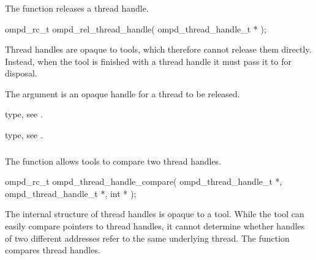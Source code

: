\subsubsection{}
\label{subsubsubsec:ompd_rel_thread_handle}
\summary
The  function releases a thread handle.

\format
\begin{cspecific}
\begin{ompSyntax}
ompd_rc_t ompd_rel_thread_handle(
  ompd_thread_handle_t *
);
\end{ompSyntax}
\end{cspecific}

\descr
Thread handles are opaque to tools, which therefore cannot release them 
directly. Instead, when the tool is finished with a thread handle it must 
pass it to  for disposal.

\argdesc
The  argument is an opaque handle for a thread to be released.

\begin{crossrefs}
\item {} type, 
see .

\item {} type, see .
\end{crossrefs}



\subsubsection{}
\label{subsubsubsec:ompd_thread_handle_compare}
\summary
The  function allows tools to compare
two thread handles.

\format
\begin{cspecific}
\begin{ompSyntax}
ompd_rc_t ompd_thread_handle_compare(
  ompd_thread_handle_t *,
  ompd_thread_handle_t *,
  int *
);
\end{ompSyntax}
\end{cspecific}

\descr
The internal structure of thread handles is opaque to a tool. While the 
tool can easily compare pointers to thread handles, it cannot determine 
whether handles of two different addresses refer to the same underlying 
thread. The  function compares thread handles.

